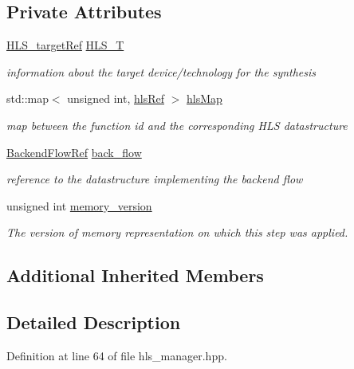 \subsection*{Private Attributes}
\begin{DoxyCompactItemize}
\item 
\hyperlink{hls__target_8hpp_a390f1d55d3b31739665ff2776abe2a3f}{H\+L\+S\+\_\+target\+Ref} \hyperlink{classHLS__manager_ac138185e1aa74471d0a571287a60870b}{H\+L\+S\+\_\+T}
\begin{DoxyCompactList}\small\item\em information about the target device/technology for the synthesis \end{DoxyCompactList}\item 
std\+::map$<$ unsigned int, \hyperlink{hls_8hpp_a75d0c73923d0ddfa28c4843a802c73a7}{hls\+Ref} $>$ \hyperlink{classHLS__manager_a40f9e16abe8d9637c1dae00884ff7bb1}{hls\+Map}
\begin{DoxyCompactList}\small\item\em map between the function id and the corresponding H\+LS datastructure \end{DoxyCompactList}\item 
\hyperlink{BackendFlow_8hpp_addb01ef393ed4ea8a79765c8ebfcf5a0}{Backend\+Flow\+Ref} \hyperlink{classHLS__manager_aaad9c20dcbaf5165fd2383b4a5583ad1}{back\+\_\+flow}
\begin{DoxyCompactList}\small\item\em reference to the datastructure implementing the backend flow \end{DoxyCompactList}\item 
unsigned int \hyperlink{classHLS__manager_a98389ee79c39eb27fb1d690e09c17f05}{memory\+\_\+version}
\begin{DoxyCompactList}\small\item\em The version of memory representation on which this step was applied. \end{DoxyCompactList}\end{DoxyCompactItemize}
\subsection*{Additional Inherited Members}


\subsection{Detailed Description}


Definition at line 64 of file hls\+\_\+manager.\+hpp.



